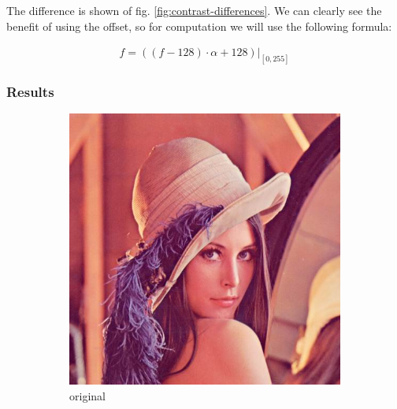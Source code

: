 \documentclass[12pt]{article}
\begin{document}
The difference is shown of fig. \ref{fig:contrast-differences}.
We can clearly see the benefit of using the offset, so for computation we will use the following formula:

\begin{equation}
    \hat{f} = \left((f - 128) \cdot \alpha + 128\right)\Big|_{[0,255]}
\end{equation}

\subsubsection{Results}

\begin{figure}[H]\centering
    \begin{subfigure}[t]{\subfiguresize}\centering
        \includegraphics[width=\textwidth]{lenac.png}
        \caption{original}
    \end{subfigure}
    \hspace{.05\textwidth}
    \begin{subfigure}[t]{\subfiguresize}\centering

\end{subfigure}
\end{figure}
\end{document}
